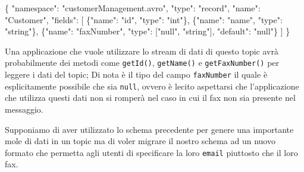 \documentclass[]{article}
\newenvironment{Shaded}{}{}
\newcommand{\DataTypeTok}[1]{\textcolor[rgb]{0.56,0.13,0.00}{#1}}
\newcommand{\StringTok}[1]{\textcolor[rgb]{0.25,0.44,0.63}{#1}}
\newcommand{\OtherTok}[1]{\textcolor[rgb]{0.00,0.44,0.13}{#1}}
\newcommand{\FunctionTok}[1]{\textcolor[rgb]{0.02,0.16,0.49}{#1}}
\begin{document}
\small 

\begin{Shaded}
\begin{Highlighting}[]
\FunctionTok{\{}
    \DataTypeTok{"namespace"}\FunctionTok{:} \StringTok{"customerManagement.avro"}\FunctionTok{,}
    \DataTypeTok{"type"}\FunctionTok{:} \StringTok{"record"}\FunctionTok{,}
    \DataTypeTok{"name"}\FunctionTok{:} \StringTok{"Customer"}\FunctionTok{,}
    \DataTypeTok{"fields"}\FunctionTok{:} \OtherTok{[}
         \FunctionTok{\{}\DataTypeTok{"name"}\FunctionTok{:} \StringTok{"id"}\FunctionTok{,} \DataTypeTok{"type"}\FunctionTok{:} \StringTok{"int"}\FunctionTok{\}}\OtherTok{,}
         \FunctionTok{\{}\DataTypeTok{"name"}\FunctionTok{:} \StringTok{"name"}\FunctionTok{,}  \DataTypeTok{"type"}\FunctionTok{:} \StringTok{"string"}\FunctionTok{\}}\OtherTok{,}
         \FunctionTok{\{}\DataTypeTok{"name"}\FunctionTok{:} \StringTok{"faxNumber"}\FunctionTok{,} \DataTypeTok{"type"}\FunctionTok{:} \OtherTok{[}\StringTok{"null"}\OtherTok{,} \StringTok{"string"}\OtherTok{]}\FunctionTok{,} \DataTypeTok{"default"}\FunctionTok{:} \StringTok{"null"}\FunctionTok{\}}
    \OtherTok{]} 
\FunctionTok{\}}
\end{Highlighting}
\end{Shaded}

\normalsize

Una applicazione che vuole utilizzare lo stream di dati di questo topic
avrà probabilmente dei metodi come \texttt{getId()}, \texttt{getName()}
e \texttt{getFaxNumber()} per leggere i dati del topic; Di nota è il
tipo del campo \texttt{faxNumber} il quale è esplicitamente possibile
che sia \texttt{null}, ovvero è lecito aspettarsi che l'applicazione che
utilizza questi dati non si romperà nel caso in cui il fax non sia
presente nel messaggio.

Supponiamo di aver utilizzato lo schema precedente per genere una
importante mole di dati in un topic ma di voler migrare il nostro schema
ad un nuovo formato che permetta agli utenti di specificare la loro
\texttt{email} piuttosto che il loro fax.

\small
\end{document}
